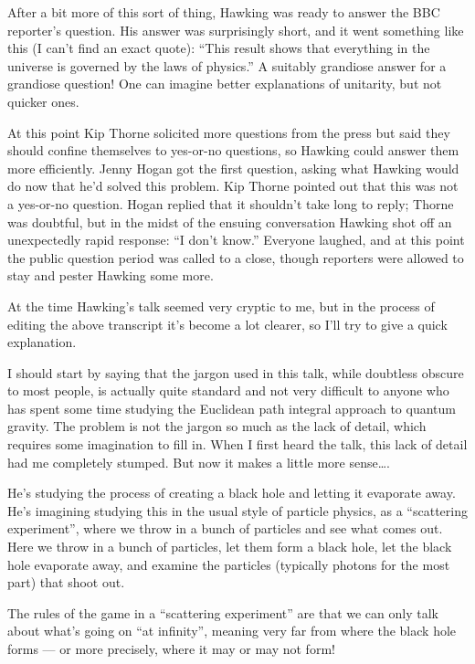 \documentclass{article}
\begin{document}
After a bit more of this sort of thing, Hawking was ready to answer the
BBC reporter's question. His answer was surprisingly short, and it went
something like this (I can't find an exact quote): ``This result shows
that everything in the universe is governed by the laws of physics.'' A
suitably grandiose answer for a grandiose question! One can imagine
better explanations of unitarity, but not quicker ones.

At this point Kip Thorne solicited more questions from the press but
said they should confine themselves to yes-or-no questions, so Hawking
could answer them more efficiently. Jenny Hogan got the first question,
asking what Hawking would do now that he'd solved this problem. Kip
Thorne pointed out that this was not a yes-or-no question. Hogan replied
that it shouldn't take long to reply; Thorne was doubtful, but in the
midst of the ensuing conversation Hawking shot off an unexpectedly rapid
response: ``I don't know.'' Everyone laughed, and at this point the
public question period was called to a close, though reporters were
allowed to stay and pester Hawking some more.

At the time Hawking's talk seemed very cryptic to me, but in the process
of editing the above transcript it's become a lot clearer, so I'll try
to give a quick explanation.

I should start by saying that the jargon used in this talk, while
doubtless obscure to most people, is actually quite standard and not
very difficult to anyone who has spent some time studying the Euclidean
path integral approach to quantum gravity. The problem is not the jargon
so much as the lack of detail, which requires some imagination to fill
in. When I first heard the talk, this lack of detail had me completely
stumped. But now it makes a little more sense\ldots.

He's studying the process of creating a black hole and letting it
evaporate away. He's imagining studying this in the usual style of
particle physics, as a ``scattering experiment'', where we throw in a
bunch of particles and see what comes out. Here we throw in a bunch of
particles, let them form a black hole, let the black hole evaporate
away, and examine the particles (typically photons for the most part)
that shoot out.

The rules of the game in a ``scattering experiment'' are that we can
only talk about what's going on ``at infinity'', meaning very far from
where the black hole forms --- or more precisely, where it may or may
not form!
\end{document}
